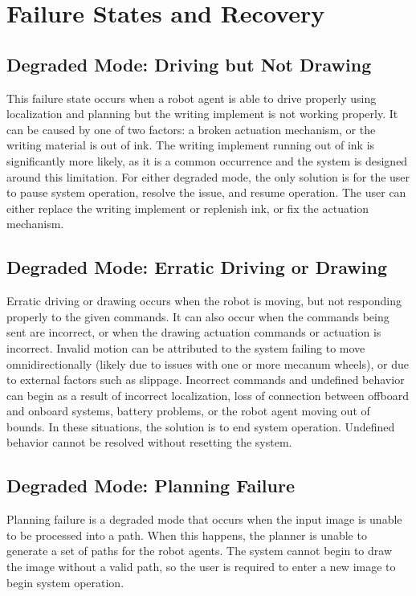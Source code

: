 
\section{Failure States and Recovery}
\label{sec:failure_states}


\subsection{Degraded Mode: Driving but Not Drawing}
This failure state occurs when a robot agent is able to drive properly using localization and planning but the writing implement is not working properly. It can be caused by one of two factors: a broken actuation mechanism, or the writing material is out of ink. The writing implement running out of ink is significantly more likely, as it is a common occurrence and the system is designed around this limitation. For either degraded mode, the only solution is for the user to pause system operation, resolve the issue, and resume operation. The user can either replace the writing implement or replenish ink, or fix the actuation mechanism.

\subsection{Degraded Mode: Erratic Driving or Drawing}
Erratic driving or drawing occurs when the robot is moving, but not responding properly to the given commands. It can also occur when the commands being sent are incorrect, or when the drawing actuation commands or actuation is incorrect. Invalid motion can be attributed to the system failing to move omnidirectionally (likely due to issues with one or more mecanum wheels), or due to external factors such as slippage. Incorrect commands and undefined behavior can begin as a result of incorrect localization, loss of connection between offboard and onboard systems, battery problems, or the robot agent moving out of bounds. In these situations, the solution is to end system operation. Undefined behavior cannot be resolved without resetting the system.

\subsection{Degraded Mode: Planning Failure}
Planning failure is a degraded mode that occurs when the input image is unable to be processed into a path. When this happens, the planner is unable to generate a set of paths for the robot agents. The system cannot begin to draw the image without a valid path, so the user is required to enter a new image to begin system operation.
